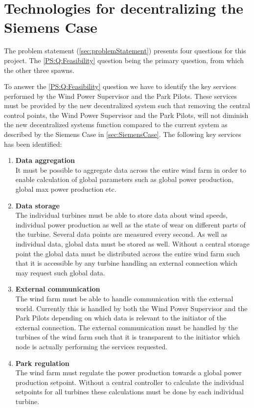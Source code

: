 \chapter{Technologies for decentralizing the Siemens Case}

The problem statement (\cref{sec:problemStatement}) presents four questions for this project. The \ref{PS:Q:Feasibility} question being the primary question, from which the other three spawns. 

To answer the \ref{PS:Q:Feasibility} question we have to identify the key services performed by the Wind Power Supervisor and the Park Pilots. These services must be provided by the new decentralized system such that removing the central control points, the Wind Power Supervisor and the Park Pilots, will not diminish the new decentralized systems function compared to the current system as described by the Siemens Case in \cref{sec:SiemensCase}. The following key services has been identified:

\begin{enumerate}[label=\textbf{\alph*.}, ref=\textit{\alph*}]
\item \label{Analysis:need:a} \textbf{Data aggregation} \\
	It must be possible to aggregate data across the entire wind farm in order to enable calculation of global parameters such as global power production, global max power production etc. 

\item \label{Analysis:need:b} \textbf{Data storage} \\
	The individual turbines must be able to store data about wind speeds, individual power production as well as the state of wear on different parts of the turbine. Several data points are measured every second. As well as individual data, global data must be stored as well. Without a central storage point the global data must be distributed across the entire wind farm such that it is accessible by any turbine handling an external connection which may request such global data.

\item \label{Analysis:need:c} \textbf{External communication} \\
	The wind farm must be able to handle communication with the external world. Currently this is handled by both the Wind Power Supervisor and the Park Pilots depending on which data is relevant to the initiator of the external connection. The external communication must be handled by the turbines of the wind farm such that it is transparent to the initiator which node is actually performing the services requested.

\item \label{Analysis:need:d} \textbf{Park regulation} \\
	The wind farm must regulate the power production towards a global power production setpoint. Without a central controller to calculate the individual setpoints for all turbines these calculations must be done by each individual turbine.
	
\end{enumerate}

